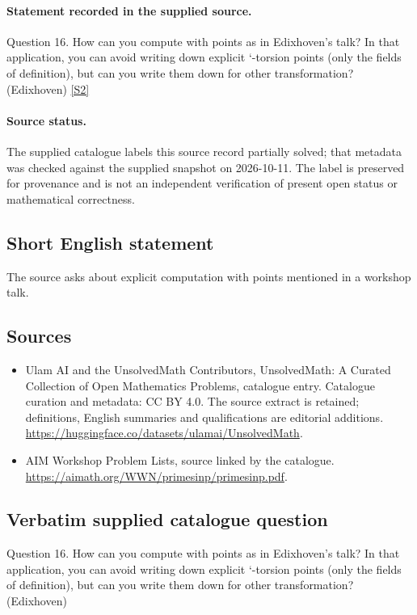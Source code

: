 \documentclass[11pt]{article}
\begin{document}
\paragraph{Statement recorded in the supplied source.}
Question 16. How can you compute with points as in Edixhoven's talk? In that application, you can avoid writing down explicit `-torsion points (only the fields of definition), but can you write them down for other transformation? (Edixhoven) \href{https://aimath.org/WWN/primesinp/primesinp.pdf}{[S2]}
\paragraph{Source status.}
The supplied catalogue labels this source record partially solved; that metadata was checked against the supplied snapshot on 2026-10-11. The label is preserved for provenance and is not an independent verification of present open status or mathematical correctness.
\subsection{Short English statement}
The source asks about explicit computation with points mentioned in a workshop talk.
\subsection{Sources}
\begin{itemize}
\item[S1] Ulam AI and the UnsolvedMath Contributors, UnsolvedMath: A Curated Collection of Open Mathematics Problems, catalogue entry. Catalogue curation and metadata: CC BY 4.0. The source extract is retained; definitions, English summaries and qualifications are editorial additions.
\url{https://huggingface.co/datasets/ulamai/UnsolvedMath}.
\item[S2] AIM Workshop Problem Lists, source linked by the catalogue.
\url{https://aimath.org/WWN/primesinp/primesinp.pdf}.
\end{itemize}
\subsection{Verbatim supplied catalogue question}
Question 16. How can you compute with points as in Edixhoven's talk? In that application, you can avoid writing down explicit `-torsion points (only the fields of definition), but can you write them down for other transformation? (Edixhoven)
\end{document}
